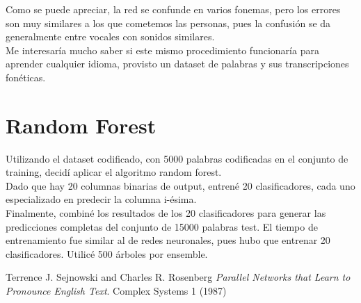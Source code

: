 \documentclass[paper=a4, fontsize=11pt]{scrartcl} %
\numberwithin{equation}{section} %
\numberwithin{figure}{section} %
\numberwithin{table}{section} %
\begin{document}
Como se puede apreciar, la red se confunde en varios fonemas, pero los errores son muy similares a los que cometemos las personas, pues la confusión se da generalmente entre vocales con sonidos similares. \\

Me interesaría mucho saber si este mismo procedimiento funcionaría para aprender cualquier idioma, provisto un dataset de palabras y sus transcripciones fonéticas.

\section{Random Forest}

Utilizando el dataset codificado, con 5000 palabras codificadas en el conjunto de training, decidí aplicar el algoritmo random forest.\\
Dado que hay 20 columnas binarias de output, entrené 20 clasificadores, cada uno especializado en predecir la columna i-ésima. \\
Finalmente, combiné los resultados de los 20 clasificadores para generar las predicciones completas del conjunto de 15000 palabras test. El tiempo de entrenamiento fue similar al de redes neuronales, pues hubo que entrenar 20 clasificadores. Utilicé 500 árboles por ensemble.\\








\begin{thebibliography}{9}
Terrence J. Sejnowski and Charles R. Rosenberg
\textit{Parallel Networks that Learn to Pronounce English Text}. 
Complex Systems 1 (1987)
 

\end{thebibliography}
\end{document}
